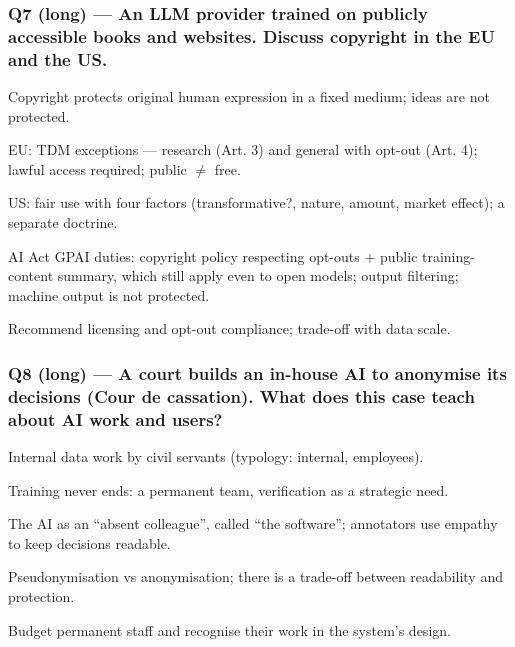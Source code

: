 \documentclass[11pt,a4paper]{article}
\newcommand{\blk}[1]{{\setlength{\fboxsep}{2pt}\colorbox{ink}{\sffamily\footnotesize\bfseries\color{white}\,#1\,}}}
\begin{document}
\subsubsection*{Q7 (long) — An LLM provider trained on publicly accessible books and websites. Discuss copyright in the EU and the US.}
\begin{description}[leftmargin=1.2cm,style=sameline]
\item[\blk{F}] Copyright protects original human expression in a fixed medium; ideas are not protected.
\item[\blk{A1}] EU: TDM exceptions — research (Art. 3) and general with opt-out (Art. 4); lawful access required; public $\neq$ free.
\item[\blk{A2}] US: fair use with four factors (transformative?, nature, amount, market effect); a separate doctrine.
\item[\blk{A3}] AI Act GPAI duties: copyright policy respecting opt-outs + public training-content summary, which still apply even to open models; output filtering; machine output is not protected.
\item[\blk{R}] Recommend licensing and opt-out compliance; trade-off with data scale.
\end{description}
\subsubsection*{Q8 (long) — A court builds an in-house AI to anonymise its decisions (Cour de cassation). What does this case teach about AI work and users?}
\begin{description}[leftmargin=1.2cm,style=sameline]
\item[\blk{F}] Internal data work by civil servants (typology: internal, employees).
\item[\blk{A1}] Training never ends: a permanent team, verification as a strategic need.
\item[\blk{A2}] The AI as an “absent colleague”, called “the software”; annotators use empathy to keep decisions readable.
\item[\blk{A3}] Pseudonymisation vs anonymisation; there is a trade-off between readability and protection.
\item[\blk{R}] Budget permanent staff and recognise their work in the system’s design.
\end{description}
\end{document}
